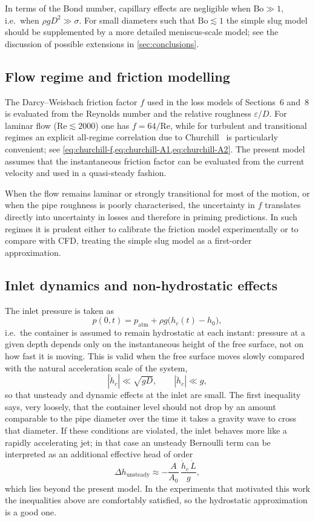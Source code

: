 \documentclass[11pt]{article}
\begin{document}
In terms of the Bond number, capillary effects are negligible when $\mathrm{Bo}\gg 1$, i.e.\
when $\rho g D^2 \gg \sigma$. For small diameters such that $\mathrm{Bo}\lesssim 1$ the simple
slug model should be supplemented by a more detailed meniscus-scale model; see the discussion
of possible extensions in \cref{sec:conclusions}.

\subsection{Flow regime and friction modelling}

The Darcy--Weisbach friction factor $f$ used in the loss models of Sections~6 and~8 is evaluated
from the Reynolds number and the relative roughness $\varepsilon/D$. For laminar flow
($\mathrm{Re}\lesssim 2000$) one has $f=64/\mathrm{Re}$, while for turbulent and transitional
regimes an explicit all-regime correlation due to Churchill~\cite{churchill} is particularly
convenient; see \cref{eq:churchill-f,eq:churchill-A1,eq:churchill-A2}. The present model assumes
that the instantaneous friction factor can be evaluated from the current velocity and used in a
quasi-steady fashion.

When the flow remains laminar or strongly transitional for most of the motion, or when the pipe
roughness is poorly characterised, the uncertainty in $f$ translates directly into uncertainty in
losses and therefore in priming predictions. In such regimes it is prudent either to calibrate
the friction model experimentally or to compare with CFD, treating the simple slug model as a
first-order approximation.

\subsection{Inlet dynamics and non-hydrostatic effects}

The inlet pressure is taken as
\[
  p(0,t)=p_{\mathrm{atm}}+\rho g\bigl(h_c(t)-h_0\bigr),
\]
i.e.\ the container is assumed to remain hydrostatic at each instant: pressure at a given depth
depends only on the instantaneous height of the free surface, not on how fast it is moving.
This is valid when the free surface moves slowly compared with the natural acceleration scale of
the system,
\[
  |\dot h_c|\ll \sqrt{gD},\qquad |\ddot h_c|\ll g,
\]
so that unsteady and dynamic effects at the inlet are small. The first inequality says,
very loosely, that the container level should not drop by an amount comparable to the
pipe diameter over the time it takes a gravity wave to cross that diameter. If these
conditions are violated, the inlet behaves more like a rapidly accelerating jet; in that
case an unsteady Bernoulli term can be interpreted as an additional effective head of
order
\[
  \Delta h_{\text{unsteady}}\approx -\frac{A}{A_0}\,\frac{\dot h_c\,\dot L}{g},
\]
which lies beyond the present model. In the experiments that motivated this work the
inequalities above are comfortably satisfied, so the hydrostatic approximation is a
good one.
\end{document}
